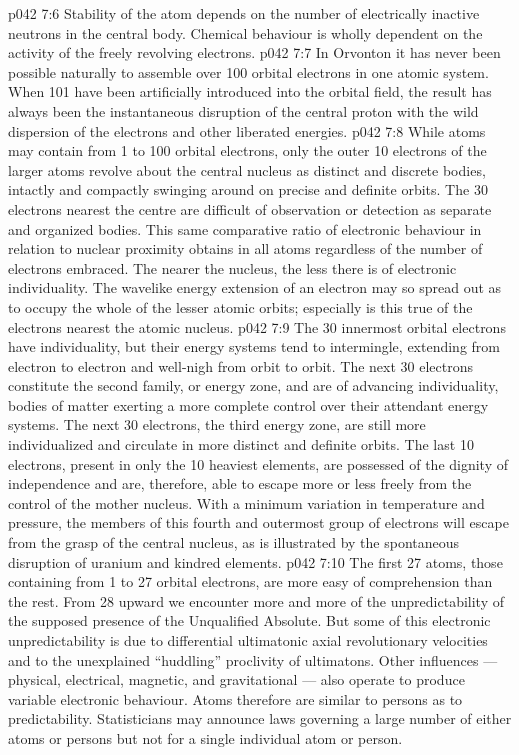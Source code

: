 \vs p042 7:6 Stability of the atom depends on the number of electrically inactive neutrons in the central body. Chemical behaviour is wholly dependent on the activity of the freely revolving electrons.
\vs p042 7:7 \pc In Orvonton it has never been possible naturally to assemble over 100 orbital electrons in one atomic system. When 101 have been artificially introduced into the orbital field, the result has always been the instantaneous disruption of the central proton with the wild dispersion of the electrons and other liberated energies.
\vs p042 7:8 \pc While atoms may contain from 1 to 100 orbital electrons, only the outer 10 electrons of the larger atoms revolve about the central nucleus as distinct and discrete bodies, intactly and compactly swinging around on precise and definite orbits. The 30 electrons nearest the centre are difficult of observation or detection as separate and organized bodies. This same comparative ratio of electronic behaviour in relation to nuclear proximity obtains in all atoms regardless of the number of electrons embraced. The nearer the nucleus, the less there is of electronic individuality. The wavelike energy extension of an electron may so spread out as to occupy the whole of the lesser atomic orbits; especially is this true of the electrons nearest the atomic nucleus.
\vs p042 7:9 The 30 innermost orbital electrons have individuality, but their energy systems tend to intermingle, extending from electron to electron and well\hyp{}nigh from orbit to orbit. The next 30 electrons constitute the second family, or energy zone, and are of advancing individuality, bodies of matter exerting a more complete control over their attendant energy systems. The next 30 electrons, the third energy zone, are still more individualized and circulate in more distinct and definite orbits. The last 10 electrons, present in only the 10 heaviest elements, are possessed of the dignity of independence and are, therefore, able to escape more or less freely from the control of the mother nucleus. With a minimum variation in temperature and pressure, the members of this fourth and outermost group of electrons will escape from the grasp of the central nucleus, as is illustrated by the spontaneous disruption of uranium and kindred elements.
\vs p042 7:10 The first 27 atoms, those containing from 1 to 27 orbital electrons, are more easy of comprehension than the rest. From 28 upward we encounter more and more of the unpredictability of the supposed presence of the Unqualified Absolute. But some of this electronic unpredictability is due to differential ultimatonic axial revolutionary velocities and to the unexplained “huddling” proclivity of ultimatons. Other influences --- physical, electrical, magnetic, and gravitational --- also operate to produce variable electronic behaviour. Atoms therefore are similar to persons as to predictability. Statisticians may announce laws governing a large number of either atoms or persons but not for a single individual atom or person.
